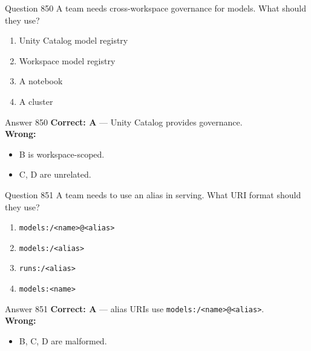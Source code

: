 \documentclass[aspectratio=169,11pt]{beamer}
\begin{document}
	\begin{frame}{Question 850}
		A team needs cross-workspace governance for models. What should they use?
		\begin{enumerate}[label=\Alph*.]
			\item Unity Catalog model registry
			\item Workspace model registry
			\item A notebook
			\item A cluster
		\end{enumerate}
	\end{frame}
	\begin{frame}{Answer 850}
		\textbf{Correct: A} --- Unity Catalog provides governance.\\
		\vspace{0.5em}
		\textbf{Wrong:}
		\begin{itemize}
			\item B is workspace-scoped.
			\item C, D are unrelated.
		\end{itemize}
	\end{frame}
	
	\begin{frame}{Question 851}
		A team needs to use an alias in serving. What URI format should they use?
		\begin{enumerate}[label=\Alph*.]
			\item \texttt{models:/<name>@<alias>}
			\item \texttt{models:/<alias>}
			\item \texttt{runs:/<alias>}
			\item \texttt{models:<name>}
		\end{enumerate}
	\end{frame}
	\begin{frame}{Answer 851}
		\textbf{Correct: A} --- alias URIs use \texttt{models:/<name>@<alias>}.\\
		\vspace{0.5em}
		\textbf{Wrong:}
		\begin{itemize}
			\item B, C, D are malformed.
		\end{itemize}
	\end{frame}
	
\end{document}
